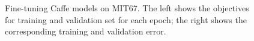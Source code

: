 \documentclass[10pt,twocolumn,letterpaper]{article}
\begin{document}
\begin{figure}[t]
\centering

\caption{Fine-tuning Caffe models on MIT67. The left shows the objectives for training and validation set for each epoch; the right shows the corresponding training and validation error.}
\label{fig:ft_curve}
\end{figure}
\end{document}
